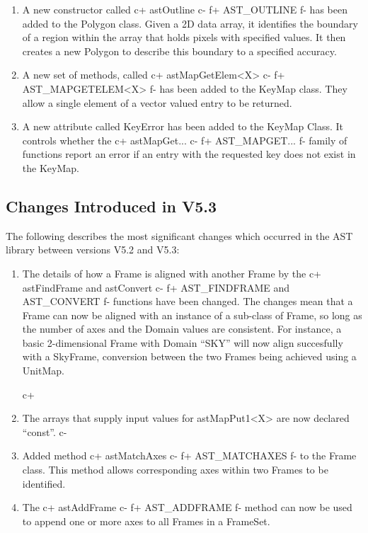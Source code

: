 \documentclass[twoside,11pt]{article}
\begin{document}
\begin{enumerate}
\item A new constructor called
c+
astOutline
c-
f+
AST\_OUTLINE
f-
has been added to the Polygon class. Given a 2D data array, it identifies
the boundary of a region within the array that holds pixels with
specified values. It then creates a new Polygon to describe this boundary
to a specified accuracy.

\item A new set of methods, called
c+
astMapGetElem<X>
c-
f+
AST\_MAPGETELEM<X>
f-
has been added to the KeyMap class. They allow a single element of a vector
valued entry to be returned.

\item A new attribute called KeyError has been added to the KeyMap Class. It
controls whether the
c+
astMapGet...
c-
f+
AST\_MAPGET...
f-
family of functions report an error if an entry with the requested key does
not exist in the KeyMap.

\end{enumerate}

\subsection{Changes Introduced in V5.3}

The following describes the most significant changes which
occurred in the AST library between versions V5.2 and V5.3:

\begin{enumerate}

\item The details of how a Frame is aligned with another Frame by the
c+
astFindFrame and astConvert
c-
f+
AST\_FINDFRAME and AST\_CONVERT
f-
functions have been changed. The changes mean that a Frame can now be
aligned with an instance of a sub-class of Frame, so long as the number
of axes and the Domain values are consistent. For instance, a basic
2-dimensional Frame with Domain ``SKY'' will now align succesfully with
a SkyFrame, conversion between the two Frames being achieved using a
UnitMap.

c+
\item The arrays that supply input values for astMapPut1<X> are now
declared ``const''.
c-

\item Added method
c+
astMatchAxes
c-
f+
AST\_MATCHAXES
f-
to the Frame class. This method allows corresponding axes within two
Frames to be identified.

\item The
c+
astAddFrame
c-
f+
AST\_ADDFRAME
f-
method can now be used to append one or more axes to all Frames in a FrameSet.
\end{enumerate}
\end{document}
